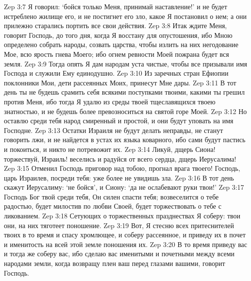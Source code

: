 Zep 3:7  Я говорил: `бойся только Меня, принимай наставление!' и не будет истреблено жилище его, и не постигнет его зло, какое Я постановил о нем; а они прилежно старались портить все свои действия.
Zep 3:8  Итак ждите Меня, говорит Господь, до того дня, когда Я восстану для опустошения, ибо Мною определено собрать народы, созвать царства, чтобы излить на них негодование Мое, всю ярость гнева Моего; ибо огнем ревности Моей пожрана будет вся земля.
Zep 3:9  Тогда опять Я дам народам уста чистые, чтобы все призывали имя Господа и служили Ему единодушно.
Zep 3:10  Из заречных стран Ефиопии поклонники Мои, дети рассеянных Моих, принесут Мне дары.
Zep 3:11  В тот день ты не будешь срамить себя всякими поступками твоими, какими ты грешил против Меня, ибо тогда Я удалю из среды твоей тщеславящихся твоею знатностью, и не будешь более превозноситься на святой горе Моей.
Zep 3:12  Но оставлю среди тебя народ смиренный и простой, и они будут уповать на имя Господне.
Zep 3:13  Остатки Израиля не будут делать неправды, не станут говорить лжи, и не найдется в устах их языка коварного, ибо сами будут пастись и покоиться, и никто не потревожит их.
Zep 3:14  Ликуй, дщерь Сиона! торжествуй, Израиль! веселись и радуйся от всего сердца, дщерь Иерусалима!
Zep 3:15  Отменил Господь приговор над тобою, прогнал врага твоего! Господь, царь Израилев, посреди тебя: уже более не увидишь зла.
Zep 3:16  В тот день скажут Иерусалиму: `не бойся', и Сиону: `да не ослабевают руки твои!'
Zep 3:17  Господь Бог твой среди тебя, Он силен спасти тебя; возвеселится о тебе радостью, будет милостив по любви Своей, будет торжествовать о тебе с ликованием.
Zep 3:18  Сетующих о торжественных празднествах Я соберу: твои они, на них тяготеет поношение.
Zep 3:19  Вот, Я стесню всех притеснителей твоих в то время и спасу хромлющее, и соберу рассеянное, и приведу их в почет и именитость на всей этой земле поношения их.
Zep 3:20  В то время приведу вас и тогда же соберу вас, ибо сделаю вас именитыми и почетными между всеми народами земли, когда возвращу плен ваш перед глазами вашими, говорит Господь.


